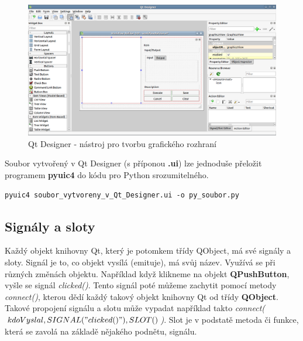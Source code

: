 \begin{figure}[h]
	\centering
	\includegraphics[scale=0.35]{pictures/qt/qt_designer}
	\caption{Qt Designer - nástroj pro tvorbu grafického rozhraní}
  	\label{qtdesigner}
\end{figure}

Soubor vytvořený v Qt Designer (s příponou \textbf{.ui}) lze jednoduše přeložit programem \textbf{pyuic4} do kódu pro Python srozumitelného. \\

\begin{lstlisting}[label=pyuic4,caption={pyuic4 - přeložení .ui souboru do pythoního kódu},morekeywords={pyuic4}]
		pyuic4 soubor_vytvoreny_v_Qt_Designer.ui -o py_soubor.py 
\end{lstlisting}

\newpage
\subsection{Signály a sloty}
Každý objekt knihovny Qt, který je potomkem třídy QObject, má své signály a sloty. Signál je to, co objekt vysílá (emituje), má svůj název. Využívá se při různých změnách objektu. Například když klikneme na objekt \textbf{QPushButton}, vyšle se signál \textit{clicked()}. Tento signál poté můžeme zachytit pomocí metody \textit{connect()}, kterou dědí každý takový objekt knihovny Qt od třídy \textbf{QObject}. Takové propojení signálu a slotu může vypadat například takto \textit{connect($kdoVyslal,SIGNAL("clicked()"), SLOT()$)}. Slot je v podstatě metoda či funkce, která se zavolá na základě nějakého podnětu, signálu. 

